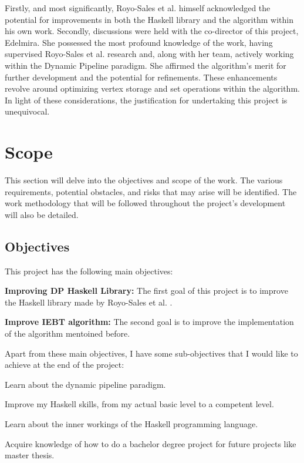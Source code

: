 Firstly, and most significantly, Royo-Sales et al. \cite{royo_sales_algorithm_2021} himself acknowledged the potential for improvements in both the Haskell library and the algorithm within his own work.
Secondly, discussions were held with the co-director of this project, Edelmira.
She possessed the most profound knowledge of the work, having supervised Royo-Sales et al. \cite{royo_sales_algorithm_2021} research and, along with her team, actively working within the Dynamic Pipeline paradigm.
She affirmed the algorithm's merit for further development and the potential for refinements.
These enhancements revolve around optimizing vertex storage and set operations within the algorithm. \\

In light of these considerations, the justification for undertaking this project is unequivocal.
\section{Scope}
This section will delve into the objectives and scope of the work.
The various requirements, potential obstacles, and risks that may arise will be identified.
The work methodology that will be followed throughout the project's development will also be detailed.
\subsection{Objectives}
This project has the following main objectives:
\begin{list}{-}{}
    \item \textbf{Improving DP Haskell Library:} The first goal of this project is to improve the Haskell library made by Royo-Sales et al. \cite{royo_sales_algorithm_2021}.
    \item \textbf{Improve IEBT algorithm:} The second goal is to improve the implementation of the algorithm mentoined before.
\end{list}
Apart from these main objectives, I have some sub-objectives that I would like to achieve at the end of the project:
\begin{list}{-}{}
    \item Learn about the dynamic pipeline paradigm.
    \item Improve my Haskell skills, from my actual basic level to a competent level.
    \item Learn about the inner workings of the Haskell programming language.
    \item Acquire knowledge of how to do a bachelor degree project for future projects like master thesis.
\end{list}
